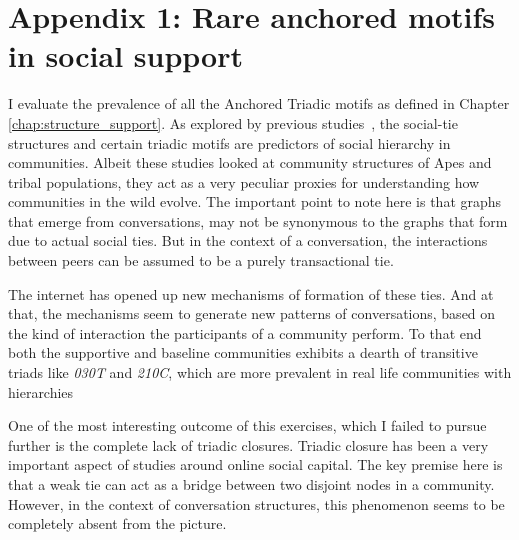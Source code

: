 \chapter{Appendix 1: Rare anchored motifs in social support}

\makeatletter
{}
\makeatother
\label{chap:app1}
\graphicspath{{Chapter3/plots/}{Chapter3/plots/figures/}{Chapter3/plots/Zscore/}}

I evaluate the prevalence of all the Anchored Triadic motifs as defined in Chapter \ref{chap:structure_support}. As explored by previous studies~\cite{shizuka2015network,shizuka2012social,holland1976local,doi:10.1177/104649647100200201}, the social-tie structures and certain triadic motifs are predictors of social hierarchy in communities. Albeit these studies looked at community structures of Apes and tribal populations, they act as a very peculiar proxies for understanding how communities in the wild evolve. The important point to note here is that graphs that emerge from conversations, may not be synonymous to the graphs that form due to actual social ties. But in the context of a conversation, the interactions between peers can be assumed to be a purely transactional tie. 

The internet has opened up new mechanisms of formation of these ties. And at that, the mechanisms seem to generate new patterns of conversations, based on the kind of interaction the participants of a community perform. To that end both the supportive and baseline communities exhibits a dearth of transitive triads like \textsl{030T} and \textsl{210C}, which are more prevalent in real life communities with hierarchies

One of the most interesting outcome of this exercises, which I failed to pursue further is the complete lack of triadic closures. Triadic closure has been a very important aspect of studies around online social capital. The key premise here is that a weak tie can act as a bridge between two disjoint nodes in a community. However, in the context of conversation structures, this phenomenon seems to be completely absent from the picture.


